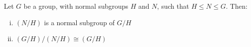 \begin{theorem}\label{thm:iso3}
    \raggedright
    Let \(G\) be a group, with normal subgroups \(H\) and \(N\), such that \(H \leqslant N \leqslant G\).
    Then:
    \begin{enumerate}[(i)]
        \item \((N / H)\) is a normal subgroup of \(G / H\)
        \item \((G / H) / (N / H) \cong (G / H)\)
    \end{enumerate}
\end{theorem}

